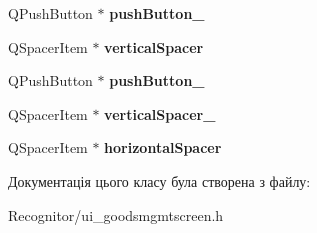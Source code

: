\begin{DoxyCompactItemize}
\item 
\hypertarget{classUi__GoodsMgmtScreen_ae22ee60fef7839256b0d27feea4da8cb}{Q\-Push\-Button $\ast$ {\bfseries push\-Button\-\_}}\label{classUi__GoodsMgmtScreen_ae22ee60fef7839256b0d27feea4da8cb}

\item 
\hypertarget{classUi__GoodsMgmtScreen_ab186a744bf6fccf3bf1365eeab01d686}{Q\-Spacer\-Item $\ast$ {\bfseries vertical\-Spacer}}\label{classUi__GoodsMgmtScreen_ab186a744bf6fccf3bf1365eeab01d686}

\item 
\hypertarget{classUi__GoodsMgmtScreen_a737f8c6f826a2506dd5ababe3b8f2390}{Q\-Push\-Button $\ast$ {\bfseries push\-Button\-\_}}\label{classUi__GoodsMgmtScreen_a737f8c6f826a2506dd5ababe3b8f2390}

\item 
\hypertarget{classUi__GoodsMgmtScreen_a64dd0fe73061c502f7c3dc84eaf0116e}{Q\-Spacer\-Item $\ast$ {\bfseries vertical\-Spacer\-\_}}\label{classUi__GoodsMgmtScreen_a64dd0fe73061c502f7c3dc84eaf0116e}

\item 
\hypertarget{classUi__GoodsMgmtScreen_aeb1cd255574a0a7fdc77fc423d826e55}{Q\-Spacer\-Item $\ast$ {\bfseries horizontal\-Spacer}}\label{classUi__GoodsMgmtScreen_aeb1cd255574a0a7fdc77fc423d826e55}

\end{DoxyCompactItemize}


Документація цього класу була створена з файлу\-:\begin{DoxyCompactItemize}
\item 
Recognitor/ui\-\_\-goodsmgmtscreen.\-h\end{DoxyCompactItemize}

